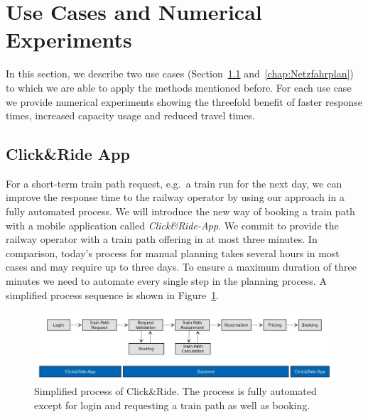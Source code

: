 \section{Use Cases and Numerical Experiments}
\label{chap:useCases}

In this section, we describe two use cases (Section~\ref{chap:CnR} and~\ref{chap:Netzfahrplan}) to which we are able to apply the methods mentioned before. For each use case we provide numerical experiments showing the threefold benefit of faster response times, increased capacity usage and reduced travel times.

\subsection{Click\&Ride App}
\label{chap:CnR}
For a short-term train path request, e.g.\ a train run for the next day, we can improve the response time to the railway operator by using our approach in a fully automated process. We will introduce the new way of booking a train path with a mobile application called \emph{Click\&Ride-App}. We commit to provide the railway operator with a train path offering in at most three minutes. In comparison, today's process for manual planning takes several hours in most cases and may require up to three days. To ensure a maximum duration of three minutes we need to automate every single step in the planning process. A simplified process sequence is shown in Figure~\ref{fig:process_sequence}.
%
\begin{figure}[htb]
	\centering
	\includegraphics[width=\textwidth]{Bilder/process_sequence.jpg}
	\caption{Simplified process of Click\&Ride. The process is fully automated except for login and requesting a train path as well as booking.}
	\label{fig:process_sequence}
\end{figure}

